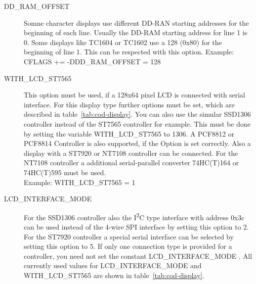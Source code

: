 \begin{description}
  \item[DD\_RAM\_OFFSET] Somne character displays use different DD-RAN starting addresses for the beginning of each line.
Usually the DD-RAM starting address for line 1 is 0.
Some displays like TC1604 or TC1602 use a 128 (0x80) for the beginning of line 1.
This can be respected with this option.
Example: CFLAGS += -DDD\_RAM\_OFFSET = 128

  \item[WITH\_LCD\_ST7565] This option must be used, if a 128x64 pixel LCD is connected with serial
interface. For this display type further options must be set, which are described in table~\ref{tab:cod-display}.
You can also use the simular SSD1306 controller instead of the ST7565 controller for example.
This must be done by setting the variable WITH\_LCD\_ST7565 to 1306.
A PCF8812 or PCF8814 Controller is also supported, if the Option is set correctly.
Also a display with a ST7920 or NT7108 controller can be connected.
For the NT7108 controller a additional serial-parallel converter 74HC(T)164 or 74HC(T)595 must be used.  \\
Example: WITH\_LCD\_ST7565 = 1 

 \item[LCD\_INTERFACE\_MODE] For the SSD1306 controller also the I\textsuperscript{2}C type interface with address 0x3c
can be used  instead of the 4-wire SPI interface by setting this option to 2.
For the ST7920 controller a special serial interface can be selected by setting this option to 5.
If only one connection type is provided for a controller, you need not set the constant LCD\_INTERFACE\_MODE .
All currently used values for LCD\_INTERFACE\_MODE and WITH\_LCD\_ST7565 are shown in table~\ref{tab:cod-display}. \\


\end{description}
